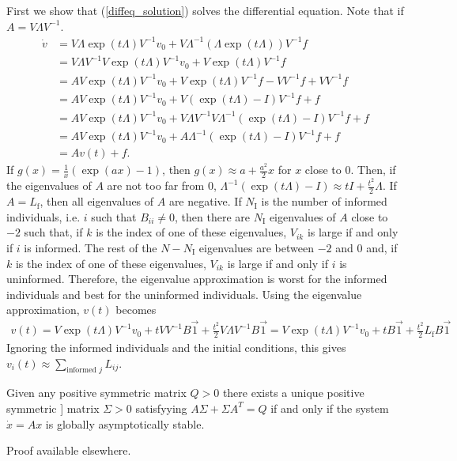 \documentclass{article}
\begin{document}
\begin{pf}
First we show that (\ref{diffeq_solution}) solves the differential equation. Note that if $A=V\Lambda V^{-1}$.
\begin{align*}
\dot{v}&=V\Lambda \exp(t\Lambda)V^{-1}v_0+V\Lambda^{-1}(\Lambda\exp(t\Lambda))V^{-1}f
\\&=V\Lambda V^{-1}V\exp(t\Lambda)V^{-1}v_0+V\exp(t\Lambda)V^{-1}f
\\&=AV\exp(t\Lambda)V^{-1}v_0+V\exp(t\Lambda)V^{-1}f-VV^{-1}f+VV^{-1}f
\\&=AV\exp(t\Lambda)V^{-1}v_0+V(\exp(t\Lambda)-I)V^{-1}f+f
\\&=AV\exp(t\Lambda)V^{-1}v_0+V\Lambda V^{-1}V \Lambda^{-1}(\exp(t\Lambda)-I)V^{-1}f+f
\\&=AV\exp(t\Lambda)V^{-1}v_0+A\Lambda^{-1}(\exp(t\Lambda)-I)V^{-1}f+f
\\&=Av(t)+f.
\end{align*}
If $g(x)=\frac{1}{x}(\exp(ax)-1)$, then $g(x)\approx a+\frac{a^2}{2}x$ for $x$ close to $0$. Then, if the eigenvalues of $A$ are not too far from $0$, $\Lambda^{-1}(\exp(t\Lambda)-I)\approx  tI+\frac{t^2}{2}\Lambda$.  If $A=L_\text{f}$, then all eigenvalues of $A$ are negative.  If $N_\text{I}$ is the number of informed individuals, i.e. $i$ such that $B_{ii}\neq0$, then there are $N_\text{I}$ eigenvalues of $A$ close to $-2$ such that, if  $k$ is the index of one of these eigenvalues, $V_{ik}$ is large if and only if $i$ is informed.  The rest of the $N-N_\text{I}$ eigenvalues are between $-2$ and $0$ and, if $k$ is the index of one of these eigenvalues, $V_{ik}$ is large if and only if $i$ is uninformed. Therefore, the eigenvalue approximation is worst for the informed individuals and best for the uninformed individuals. Using the eigenvalue approximation, $v(t)$ becomes 
\begin{align*}
v(t)=V\exp(t\Lambda)V^{-1}v_0+tVV^{-1}B\vec{1}+\frac{t^2}{2}V\Lambda V^{-1}B\vec{1}=V\exp(t\Lambda)V^{-1}v_0+tB\vec{1}+\frac{t^2}{2}L_\text{f}B\vec{1}
\end{align*}
Ignoring the informed individuals and the initial conditions, this gives $v_i(t)\approx \sum_{\text{informed } j}L_{ij}$.
\end{pf}

\begin{theorem} \label{lyapeq_theorem}
Given any positive symmetric matrix $Q>0$ there exists a unique positive symmetric ] matrix $\Sigma>0$ satisfyying $A\Sigma+\Sigma A^T=Q$ if and only if the system $\dot{x}=Ax$ is globally asymptotically stable.
\end{theorem}
\begin{pf}
Proof available elsewhere.
\end{pf}
\end{document}
